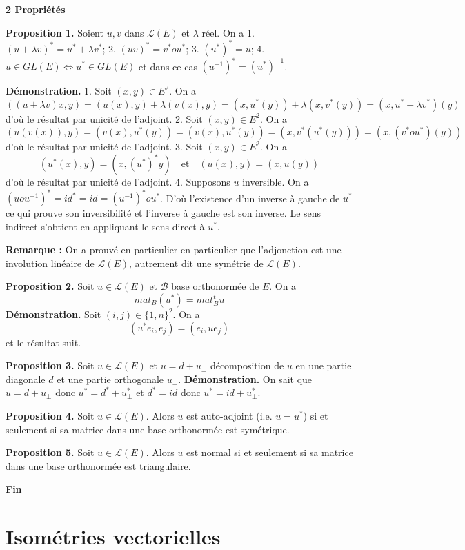 \textbf{2 Propriétés}

\textbf{Proposition 1.} Soient $u, v$ dans $\mathcal{L}(E)$ et $\lambda$ réel. On a
1. $(u + \lambda v)^* = u^* + \lambda v^*$;
2. $(uv)^* = v^*o u^*$;
3. $(u^*)^* = u$;
4. $u \in GL(E) \iff u^* \in GL(E)$ et dans ce cas $(u^{-1})^* = (u^*)^{-1}$.

\textbf{Démonstration.} 1. Soit $(x,y) \in E^2$. On a
\[ ((u + \lambda v)x, y) = (u(x), y) + \lambda (v(x), y) = (x, u^*(y)) + \lambda (x, v^*(y)) = (x, u^* + \lambda v^*)(y) \]
d'où le résultat par unicité de l'adjoint.
2. Soit $(x,y) \in E^2$. On a
\[ (u(v(x)), y) = (v(x), u^*(y)) = (v(x), u^*(y)) = (x, v^* (u^*(y))) = (x, (v^*o u^*)(y)) \]
d'où le résultat par unicité de l'adjoint.
3. Soit $(x,y) \in E^2$. On a
\[ (u^*(x), y) = (x, (u^*)^*y) \quad \text{et} \quad (u(x), y) = (x, u(y)) \]
d'où le résultat par unicité de l'adjoint.
4. Supposons $u$ inversible. On a $(uou^{-1})^* = id^* = id = (u^{-1})^*o u^*$. D'où l'existence d'un inverse à gauche de $u^*$ ce qui prouve son inversibilité et l'inverse à gauche est son inverse. Le sens indirect s'obtient en appliquant le sens direct à $u^*$.

\textbf{Remarque :} On a prouvé en particulier en particulier que l'adjonction est une involution linéaire de $\mathcal{L}(E)$, autrement dit une symétrie de $\mathcal{L}(E)$.

\textbf{Proposition 2.} Soit $u \in \mathcal{L}(E)$ et $\mathcal{B}$ base orthonormée de $E$. On a
\[ mat_{B}(u^*) = mat_{B}^t u \]
\textbf{Démonstration.} Soit $(i,j) \in \{1, n\}^2$. On a
\[ (u^*e_i, e_j) = (e_i, ue_j) \]
et le résultat suit.

\textbf{Proposition 3.} Soit $u \in \mathcal{L}(E)$ et $u = d + u_{\perp}$ décomposition de $u$ en une partie diagonale $d$ et une partie orthogonale $u_{\perp}$.
\textbf{Démonstration.} On sait que $u = d + u_{\perp}$ donc $u^* = d^* + u_{\perp}^*$ et $d^* = id$ donc $u^* = id + u_{\perp}^*$.

\textbf{Proposition 4.} Soit $u \in \mathcal{L}(E)$. Alors $u$ est auto-adjoint (i.e. $u = u^*$) si et seulement si sa matrice dans une base orthonormée est symétrique.

\textbf{Proposition 5.} Soit $u \in \mathcal{L}(E)$. Alors $u$ est normal si et seulement si sa matrice dans une base orthonormée est triangulaire.

\textbf{Fin}


\section{Isométries vectorielles}


